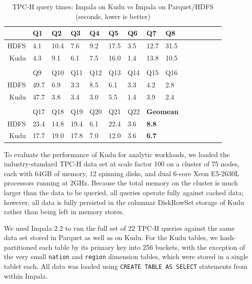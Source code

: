 \documentclass{vldb}
\begin{document}
\begin{table}
  \begin{tabular}{rllllllllllllll}
& Q1 & Q2 & Q3 & Q4 & Q5 & Q6 & Q7 & Q8\\\hline
HDFS & 4.1 & 10.4 & 7.6 & 9.2 & 17.5 & 3.5 & 12.7 & 31.5\\
Kudu & 4.3 & 9.1 & 6.1 & 7.5 & 16.0 & 1.4 & 13.8 & 10.5 \\\\

& Q9 & Q10 & Q11 & Q12 & Q13 & Q14 & Q15 & Q16\\\hline
HDFS & 49.7 & 6.9 & 3.3 & 8.5 & 6.1 & 3.3 & 4.2 & 2.8\\
Kudu & 47.7 & 3.8 & 3.4 & 3.0 & 5.5 & 1.4 & 3.9 & 2.4\\\\

& Q17 & Q18 & Q19 & Q20 & Q21 & Q22 & \multicolumn{3}{l}{\bf Geomean}\\\hline
HDFS & 23.4 & 14.8 & 19.4 & 6.1 & 22.4 & 3.6 & \multicolumn{3}{l}{\bf 8.8} \\
Kudu & 17.7 & 19.0 & 17.8 & 7.0 & 12.0 & 3.6 & \multicolumn{3}{l}{\bf 6.7}
  \end{tabular}
  \caption{TPC-H query times: Impala on Kudu vs Impala on Parquet/HDFS (seconds, lower is better)}
  \label{fig:parquet_vs_kudu}
\end{table}

To evaluate the performance of Kudu for analytic workloads, we loaded the industry-standard TPC-H
data set at scale factor 100 on a cluster of 75 nodes, each with 64GB of memory, 12 spinning
disks, and dual 6-core Xeon E5-2630L processors running at 2GHz. Because the total memory on the
cluster is much larger than the data to be queried, all queries operate fully against cached
data; however, all data is fully persisted in the columnar DiskRowSet storage of Kudu rather than being
left in memory stores.

We used Impala 2.2 to run the full set of 22 TPC-H queries against the same data set stored in Parquet
as well as on Kudu. For the Kudu tables, we hash-partitioned each table by its primary key into
256 buckets, with the exception of the very small {\tt nation} and {\tt region} dimension tables,
which were stored in a single tablet each. All data was loaded using {\tt CREATE
TABLE AS SELECT} statements from within Impala.
\end{document}
